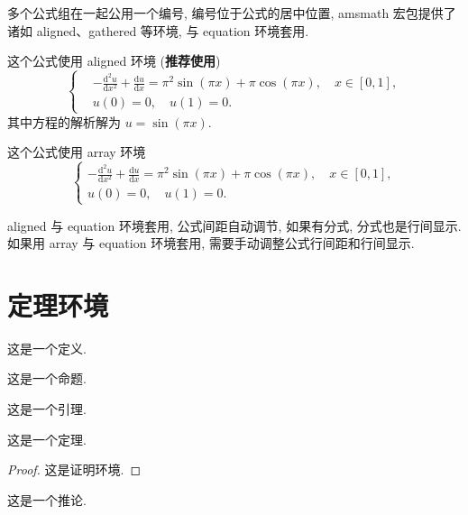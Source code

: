 多个公式组在一起公用一个编号, 编号位于公式的居中位置, amsmath 宏包提供了诸如 aligned、gathered 等环境, 与 equation 环境套用.

这个公式使用 aligned 环境 (\textbf{推荐使用})
\begin{equation}\label{eq:alignedEq}
\left\{\begin{aligned}
  &-\frac{\mathrm{d}^{2} u}{\mathrm{d} x^{2}}+\frac{\mathrm{d} u}{\mathrm{d} x}=\pi^{2} \sin (\pi x)+\pi \cos (\pi x),\quad x \in [0,1], \\
  &u(0)=0,\quad u(1)=0.
\end{aligned} \right.
\end{equation}
其中方程的解析解为 $u=\sin(\pi x)$.

这个公式使用 array 环境
\begin{equation}\label{eq:arrayEq}
\left\{\begin{array}{l}
\displaystyle
-\frac{\mathrm{d}^{2} u}{\mathrm{d} x^{2}}+\frac{\mathrm{d} u}{\mathrm{d} x}=\pi^{2} \sin (\pi x)+\pi \cos (\pi x),\quad x \in [0,1], \\[6pt]
u(0)=0,\quad u(1)=0.
\end{array} \right.
\end{equation}

aligned 与 equation 环境套用, 公式间距自动调节, 如果有分式, 分式也是行间显示. 如果用 array 与 equation 环境套用, 需要手动调整公式行间距和行间显示.


\section{定理环境}

\begin{definition}\label{def:foo}
这是一个定义.
\end{definition}

\begin{proposition}\label{prop:foo}
这是一个命题.
\end{proposition}

\begin{lemma}[Lemma]\label{lmm:foo}
这是一个引理.
\end{lemma}

\begin{theorem}[Theorem]\label{thm:foo}
这是一个定理.
\end{theorem}
\begin{proof}
这是证明环境.
\end{proof}

\begin{corollary}\label{cor:foo}
这是一个推论.
\end{corollary}

